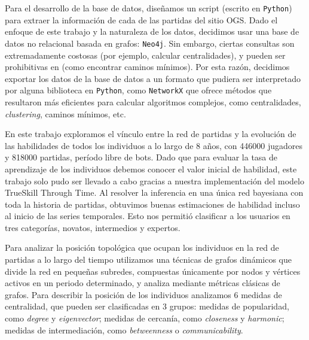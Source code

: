 \documentclass[a4paper,11pt]{book}
\theoremstyle{definition}
\begin{document}

Para el desarrollo de la base de datos, dise\~namos un script (escrito en \texttt{Python}) para extraer la informaci\'on de cada de las partidas del sitio OGS.
%
Dado el enfoque de este trabajo y la naturaleza de los datos, decidimos usar una base de datos no relacional basada en grafos: \texttt{Neo4j}.
Sin embargo, ciertas consultas son extremadamente costosas (por ejemplo, calcular centralidades), y pueden ser prohibitivas en (como encontrar caminos m\'inimos).
%
Por esta raz\'on, decidimos exportar los datos de la base de datos a un formato que pudiera ser interpretado por alguna biblioteca en \texttt{Python}, como \texttt{NetworkX} que ofrece m\'etodos que resultaron m\'as eficientes para calcular algoritmos complejos, como centralidades, \emph{clustering}, caminos m\'inimos, etc.


En este trabajo exploramos el v\'inculo entre la red de partidas y la evoluci\'on de las habilidades de todos los individuos a lo largo de 8 a\~nos, con \num{446000} jugadores y \num{818000} partidas, per\'iodo libre de bots.
%
Dado que para evaluar la tasa de aprendizaje de los individuos debemos conocer el valor inicial de habilidad, este trabajo solo pudo ser llevado a cabo gracias a nuestra implementaci\'on del modelo TrueSkill Through Time.
%
Al resolver la inferencia en una \'unica red bayesiana con toda la historia de partidas, obtuvimos buenas estimaciones de habilidad incluso al inicio de las series temporales.
%
Esto nos permiti\'o clasificar a los usuarios en tres categor\'ias, novatos, intermedios y expertos.


Para analizar la posici\'on topol\'ogica que ocupan los individuos en la red de partidas a lo largo del tiempo utilizamos una t\'ecnicas de grafos din\'amicos que divide la red en peque\~nas subredes, compuestas \'unicamente por nodos y v\'ertices activos en un periodo determinado, y analiza mediante m\'etricas cl\'asicas de grafos.
%
Para describir la posici\'on de los individuos analizamos 6 medidas de centralidad, que pueden ser clasificadas en 3 grupos: medidas de popularidad, como \emph{degree} y \emph{eigenvector}; medidas de cercan\'ia, como \emph{closeness} y \emph{harmonic}; medidas de intermediaci\'on, como \emph{betweenness} o \emph{communicability}.
\end{document}
